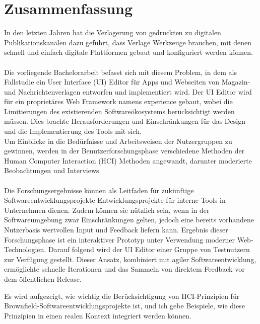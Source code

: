 %

\chapter*{Zusammenfassung}

In den letzten Jahren hat die Verlagerung von gedruckten zu digitalen Publikationskanälen dazu geführt, dass Verlage Werkzeuge brauchen, mit denen schnell und einfach digitale Plattformen gebaut und konfiguriert werden können.
\\\\
Die vorliegende Bachelorarbeit befasst sich mit diesem Problem, in dem als Fallstudie ein User Interface (UI) Editor für Apps und Webseiten von Magazin- und Nachrichtenverlagen entworfen und implementiert wird.
Der UI Editor wird für ein proprietäres Web Framework namens \Gls{experience} gebaut, wobei die Limitierungen des existierenden Softwareökosystems berücksichtigt werden müssen.
Dies brachte Herausforderungen und Einschränkungen für das Design und die Implementierung des Tools mit sich.
\\
Um Einblicke in die Bedürfnisse und Arbeitsweisen der Nutzergruppen zu gewinnen, werden in der Benutzerforschungsphase verschiedene Methoden der Human Computer Interaction (HCI)
Methoden angewandt, darunter moderierte Beobachtungen und Interviews.
\\\\
Die Forschungsergebnisse können als Leitfaden für zukünftige Softwareentwicklungsprojekte
Entwicklungsprojekte für interne Tools in Unternehmen dienen.
Zudem können sie nützlich sein, wenn in der Softwareumgebung zwar Einschränkungen gelten, jedoch eine bereits vorhandene Nutzerbasis wertvollen Input und Feedback liefern kann.
Ergebnis dieser Forschungsphase ist ein interaktiver Prototyp unter Verwendung moderner Web-Technologien. Darauf folgend wird der UI Editor einer Gruppe von Testnutzern zur Verfügung gestellt.
Dieser Ansatz, kombiniert mit agiler Softwareentwicklung, ermöglichte schnelle Iterationen und das Sammeln von direktem Feedback vor dem öffentlichen Release.

Es wird aufgezeigt, wie wichtig die Berücksichtigung von HCI-Prinzipien für Brownfield-Softwareentwicklungsprojekte ist, und ich gebe Beispiele, wie diese Prinzipien in einen realen Kontext integriert werden können.